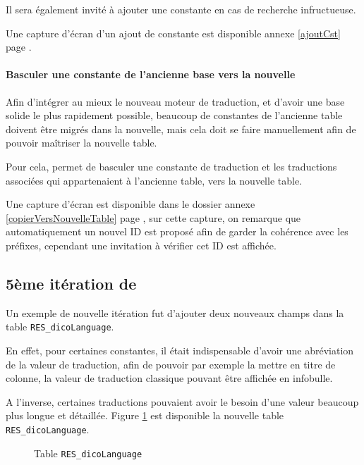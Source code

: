            Il sera également invité à ajouter une constante en cas de recherche infructueuse.

        Une capture d'écran d'un ajout de constante est disponible annexe \ref{ajoutCst} page \pageref{ajoutCst}.
        \paragraph{Basculer une constante de l'ancienne base vers la nouvelle}
            Afin d'intégrer au mieux le nouveau moteur de traduction, et d'avoir une base solide le plus rapidement possible, beaucoup de constantes de l'ancienne table doivent être migrés dans la nouvelle, mais cela doit se faire manuellement afin de pouvoir maîtriser la nouvelle table.

            Pour cela, \mlanguage{} permet de basculer une constante de traduction et les traductions associées qui appartenaient à l'ancienne table, vers la nouvelle table.

        Une capture d'écran est disponible dans le dossier annexe \ref{copierVersNouvelleTable} page \pageref{copierVersNouvelleTable}, sur cette capture, on remarque que automatiquement un nouvel ID est proposé afin de garder la cohérence avec les préfixes, cependant une invitation à vérifier cet ID est affichée.

	\subsection{5ème itération de \mlanguage{}}\label{iteration}
        Un exemple de nouvelle itération fut d'ajouter deux nouveaux champs dans la table \texttt{RES\_dicoLanguage}.

		En effet, pour certaines constantes, il était indispensable d'avoir une abréviation de la valeur de traduction, afin de pouvoir par exemple la mettre en titre de colonne, la valeur de traduction classique pouvant être affichée en infobulle.
		
		A l'inverse, certaines traductions pouvaient avoir le besoin d'une valeur beaucoup plus longue et détaillée.
\newpage
Figure \ref{fig:nouvelleNouvelletable} est disponible la nouvelle table \texttt{RES\_dicoLanguage}.
\begin{figure}[H]
    \centering
	
    \vspace{-5px}
	\caption{Table \texttt{RES\_dicoLanguage}}
    \label{fig:nouvelleNouvelletable}
\end{figure}

